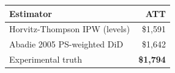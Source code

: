 \begin{tabular}{lr}
\toprule
\textbf{Estimator} & \textbf{ATT} \\
\midrule
Horvitz-Thompson IPW (levels)     & \$1,591 \\
Abadie 2005 PS-weighted DiD       & \$1,642 \\
\midrule
Experimental truth                & \textcolor{rmgold}{\textbf{\$1,794}} \\
\bottomrule
\end{tabular}
